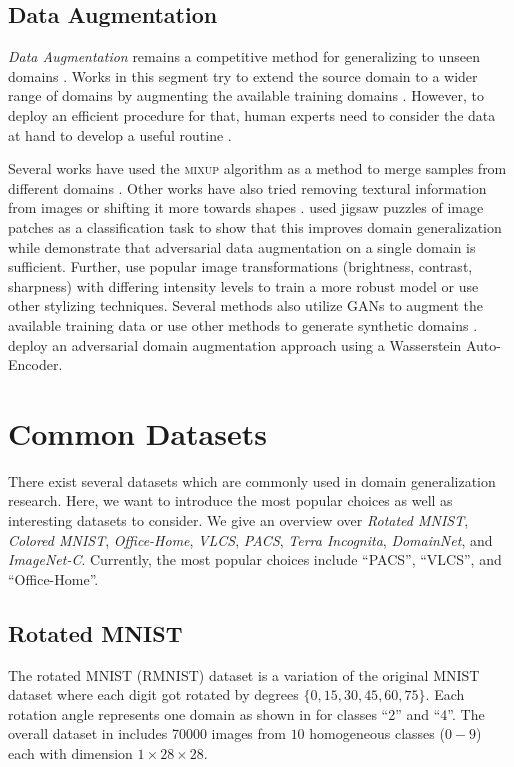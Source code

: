 \subsection{Data Augmentation}
\emph{Data Augmentation} remains a competitive method for generalizing to unseen domains \citep{zhang2019unseen}. Works in this segment try to extend the source domain to a wider range of domains by augmenting the available training domains \citep{huang2020selfchallenging}. However, to deploy an efficient procedure for that, human experts need to consider the data at hand to develop a useful routine \citep{gulrajani2020search}.

Several works have used the \textsc{mixup} \citep{ZhangCDL18} algorithm as a method to merge samples from different domains \citep{XuZNLWTZ20, yan2020improve, WangLK20, mancini2020}. Other works have also tried removing textural information from images \citep{WangHLX19} or shifting it more towards shapes \citep{nam2019reducing, asadi2019shape}. \citet{CarlucciDBCT19} used jigsaw puzzles of image patches as a classification task to show that this improves domain generalization while \citet{VolpiNSDMS18} demonstrate that adversarial data augmentation on a single domain is sufficient. Further, \citet{VolpiM19} use popular image transformations (\eg brightness, contrast, sharpness) with differing intensity levels to train a more robust model or \citet{somavarapu2020frustratingly} use other stylizing techniques. Several methods also utilize GANs to augment the available training data  \citep{RahmanFBS19, ZhouYHX20, ShankarPCCJS18} or use other methods to generate synthetic domains \citep{zhou2020learning}. \citet{QiaoZP20} deploy an adversarial domain augmentation approach using a Wasserstein Auto-Encoder.



\section{Common Datasets}

There exist several datasets which are commonly used in domain generalization research. Here, we want to introduce the most popular choices as well as interesting datasets to consider. We give an overview over \emph{Rotated MNIST}, \emph{Colored MNIST}, \emph{Office-Home}, \emph{VLCS}, \emph{PACS}, \emph{Terra Incognita}, \emph{DomainNet}, and \emph{ImageNet-C}. Currently, the most popular choices include ``PACS'', ``VLCS'', and ``Office-Home''.

\subsection{Rotated MNIST}
The rotated MNIST (RMNIST) dataset \citep{GhifaryKZB15} is a variation of the original MNIST dataset \citep{lecun-mnisthandwrittendigit-2010} where each digit got rotated by degrees $\{0, 15, 30, 45, 60, 75\}$. Each rotation angle represents one domain as shown in  for classes ``2'' and ``4''. The overall dataset in \citet{gulrajani2020search} includes \num{70000} images from $10$ homogeneous classes ($0-9$) each with dimension $1\times28\times28$.

